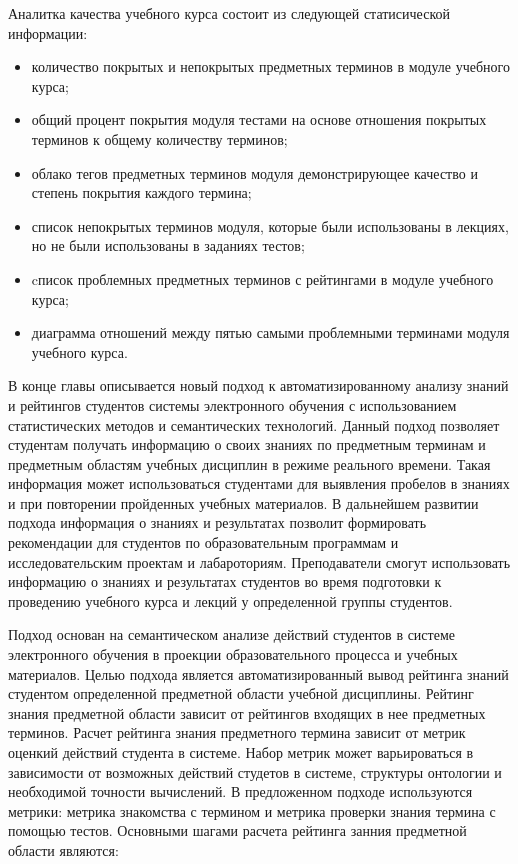 Аналитка качества учебного курса состоит из следующей статисической информации:
\begin{itemize}
\item количество покрытых и непокрытых предметных терминов в модуле учебного курса;
\item общий процент покрытия модуля тестами на основе отношения покрытых терминов к общему количеству терминов;
\item облако тегов предметных терминов модуля демонстрирующее качество и степень покрытия каждого термина;
\item список непокрытых терминов модуля, которые были использованы в лекциях, но не были использованы в заданиях тестов;
\item cписок проблемных предметных терминов с рейтингами в модуле учебного курса;
\item диаграмма отношений между пятью самыми проблемными терминами модуля учебного курса.
\end{itemize}


В конце главы описывается новый подход к автоматизированному анализу знаний и рейтингов студентов системы электронного обучения с использованием статистических методов и семантических технологий. Данный подход позволяет студентам получать информацию о своих знаниях по предметным терминам и предметным областям учебных дисциплин в режиме реального времени. Такая информация может использоваться студентами для выявления пробелов в знаниях и при повторении пройденных учебных материалов. В дальнейшем развитии подхода информация о знаниях и результатах позволит формировать рекомендации для студентов по образовательным программам и исследовательским проектам и лабароториям. Преподаватели смогут использовать информацию о знаниях и результатах студентов во время подготовки к проведению учебного курса и лекций у определенной группы студентов.

Подход основан на семантическом анализе действий студентов в системе электронного обучения в проекции образовательного процесса и учебных материалов. Целью подхода является автоматизированный вывод рейтинга знаний студентом определенной предметной области учебной дисциплины. Рейтинг знания предметной области зависит от рейтингов входящих в нее предметных терминов. Расчет рейтинга знания предметного термина зависит от метрик оценкий действий студента в системе. Набор метрик может варьироваться в зависимости от возможных действий студетов в системе, структуры онтологии и необходимой точности вычислений. В предложенном подходе используются метрики: метрика знакомства с термином и метрика проверки знания термина с помощью тестов. Основными шагами расчета рейтинга занния предметной области являются:



